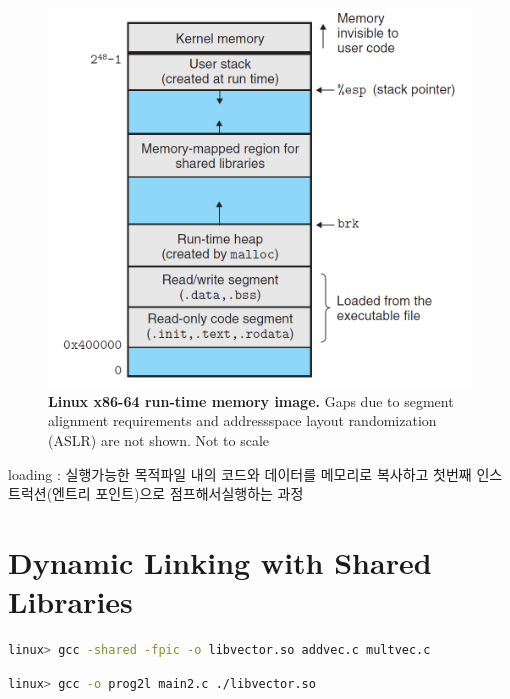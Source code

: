 \begin{figure}[h!]
    \centering
    \includegraphics[scale=0.5]{pic/section7/pic5.png}
    \caption{\textbf{Linux x86-64 run-time memory image.} 
    Gaps due to segment alignment requirements and addressspace layout randomization (ASLR) are not shown. Not to scale}
\end{figure}

loading : 실행가능한 목적파일 내의 코드와 데이터를 메모리로 복사하고 첫번째 인스트럭션(엔트리 포인트)으로 점프해서실행하는 과정

\section{Dynamic Linking with Shared Libraries}

\begin{lstlisting}[language=bash]
linux> gcc -shared -fpic -o libvector.so addvec.c multvec.c
\end{lstlisting}

\begin{lstlisting}[language=bash]
    linux> gcc -o prog2l main2.c ./libvector.so
\end{lstlisting}

